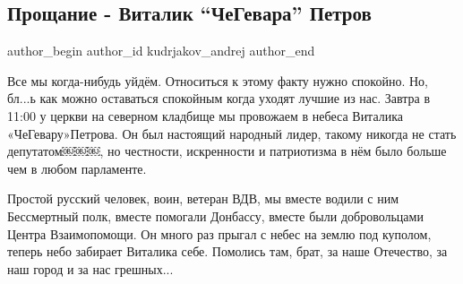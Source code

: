  
 
 
 
 
 
\subsection{Прощание - Виталик \enquote{ЧеГевара} Петров}
\label{sec:23_08_2021.fb.kudrjakov_andrej.1.proschanie}
 
\ifcmt
 author_begin
   author_id kudrjakov_andrej
 author_end
\fi

Все мы когда-нибудь уйдём. Относиться к этому факту нужно спокойно. Но, бл...ь
как можно оставаться спокойным когда уходят лучшие из нас. Завтра в 11:00 у
церкви на северном кладбище мы провожаем в небеса Виталика «ЧеГевару»Петрова.
Он был настоящий народный лидер, такому никогда не стать депутатом￼￼￼, но
честности, искренности и патриотизма в нём было больше чем в любом парламенте.


Простой русский человек, воин, ветеран ВДВ, мы вместе водили с ним Бессмертный
полк, вместе помогали Донбассу, вместе были добровольцами Центра Взаимопомощи.
Он много раз прыгал с небес на землю под куполом, теперь небо забирает Виталика
себе. Помолись там, брат, за наше Отечество, за наш город и за нас грешных...

